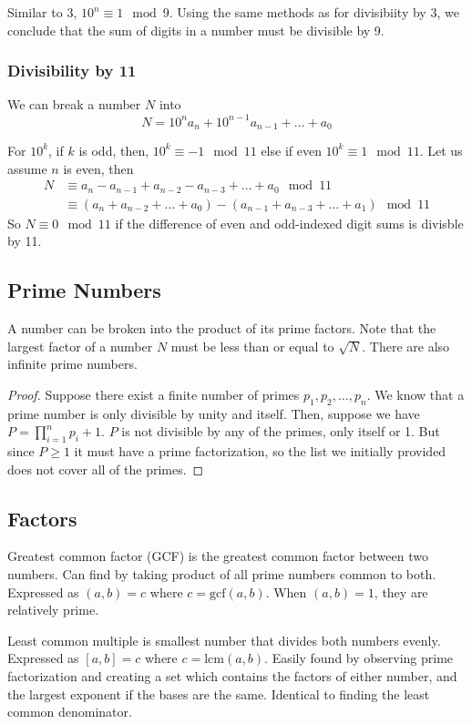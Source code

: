 Similar to 3, $10^n\equiv 1 \mod 9$. Using the same methods as for divisibiity by 3,
we conclude that the sum of digits in a number must be divisible by 9.

\subsubsection{Divisibility by 11}

We can break a number $N$ into
\begin{equation*}
    N=10^na_n + 10^{n-1}a_{n-1} + \ldots + a_0
\end{equation*}

For $10^k$, if $k$ is odd, then, $10^k\equiv -1\mod 11$ else if even $10^k\equiv 1\mod 11$.
Let us assume $n$ is even, then
\begin{align*}
    N&\equiv a_n-a_{n-1}+a_{n-2}-a_{n-3}+\ldots+a_0\mod 11\\
    &\equiv (a_n+a_{n-2}+\ldots+a_0)-(a_{n-1}+a_{n-3}+\ldots+a_1)\mod 11
\end{align*}
So $N\equiv 0\mod 11$ if the difference of even and odd-indexed digit sums is divisble by 11.

\subsection{Prime Numbers}

A number can be broken into the product of its prime factors.
Note that the largest factor of a number $N$ must be less than or equal to $\sqrt{N}$.
There are also infinite prime numbers.

\begin{proof}
    Suppose there exist a finite number of primes $p_1,p_2,\ldots,p_n$.
    We know that a prime number is only divisible by unity and itself.
    Then, suppose we have $P=\prod_{i=1}^n p_i + 1$. $P$ is not divisible by any of the primes,
    only itself or 1. But since $P\geq 1$ it must have a prime factorization, so the list we initially provided does not cover all of the primes.
\end{proof}

\subsection{Factors}

Greatest common factor (GCF) is the greatest common factor between two numbers.
Can find by taking product of all prime numbers common to both. Expressed as $(a,b)=c$ where $c=\mathrm{gcf}(a,b)$.
When $(a,b)=1$, they are relatively prime.

Least common multiple is smallest number that divides both numbers evenly.
Expressed as $[a,b]=c$ where $c=\mathrm{lcm}(a,b)$. Easily found by observing prime factorization
and creating a set which contains the factors of either number, and the largest exponent if the bases are the same.
Identical to finding the least common denominator.
